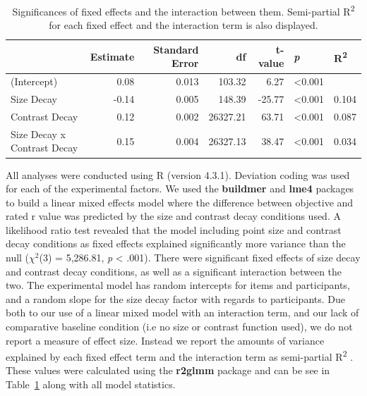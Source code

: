 \documentclass[manuscript, review, anonymous, screen]{acmart}
\begin{document}
\hypertarget{tbl-sig}{}
\begin{table}
\caption{\label{tbl-sig}Significances of fixed effects and the interaction between them.
Semi-partial R\textsuperscript{2} for each fixed effect and the
interaction term is also displayed. }\tabularnewline

\centering
\begin{tabular}{lrrrrll}
\toprule
  & Estimate & Standard Error & df & t-value & \textit{p} & R\textsuperscript{2}\\
\midrule
(Intercept) & 0.08 & 0.013 & 103.32 & 6.27 & <0.001 & \\
Size Decay & -0.14 & 0.005 & 148.39 & -25.77 & <0.001 & 0.104\\
Contrast Decay & 0.12 & 0.002 & 26327.21 & 63.71 & <0.001 & 0.087\\
Size Decay x Contrast Decay & 0.15 & 0.004 & 26327.13 & 38.47 & <0.001 & 0.034\\
\bottomrule
\end{tabular}
\end{table}

All analyses were conducted using R (version 4.3.1). Deviation coding
was used for each of the experimental factors. We used the
\textbf{buildmer} and \textbf{lme4} packages to build a linear mixed
effects model where the difference between objective and rated r value
was predicted by the size and contrast decay conditions used. A
likelihood ratio test revealed that the model including point size and
contrast decay conditions as fixed effects explained significantly more
variance than the null (\(\chi^2\)(3) = 5,286.81, \emph{p} \textless{}
.001). There were significant fixed effects of size decay and contrast
decay conditions, as well as a significant interaction between the two.
The experimental model has random intercepts for items and participants,
and a random slope for the size decay factor with regards to
participants. Due both to our use of a linear mixed model with an
interaction term, and our lack of comparative baseline condition (i.e no
size or contrast function used), we do not report a measure of effect
size. Instead we report the amounts of variance explained by each fixed
effect term and the interaction term as semi-partial
R\textsuperscript{2} \citep{nakagawa_2013}. These values were calculated
using the \textbf{r2glmm} package \citep{r2glmm} and can be see in
Table~\ref{tbl-sig} along with all model statistics.
\end{document}
